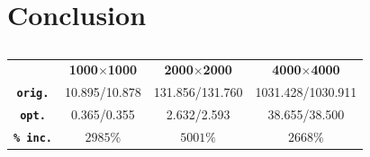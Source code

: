 \documentclass[11pt,twocolumn,a4paper]{article}
\begin{document}
\section{Conclusion}




\vspace{-0.2cm}
\begin{table}[h]
\begin{adjustwidth}{-0.15cm}{}
\small
\centering
\begin{tabular}{c|c|c|c}
    & \textbf{1000$\times$1000} & \textbf{2000$\times$2000} & \textbf{4000$\times$4000}   \\
\textbf{\texttt{orig.}} & 10.895/10.878 & 131.856/131.760 & 1031.428/1030.911 \\
\textbf{\texttt{opt.}} & 0.365/0.355 & 2.632/2.593 & 38.655/38.500 \\
\textbf{\texttt{\% inc.}} & $2985\%$ & $5001\%$ & $2668\%$ \\
\end{tabular}
\caption{}
\label{finalResults}
\end{adjustwidth}
\end{table}\par
\vspace{-0.22cm}

\end{document}
